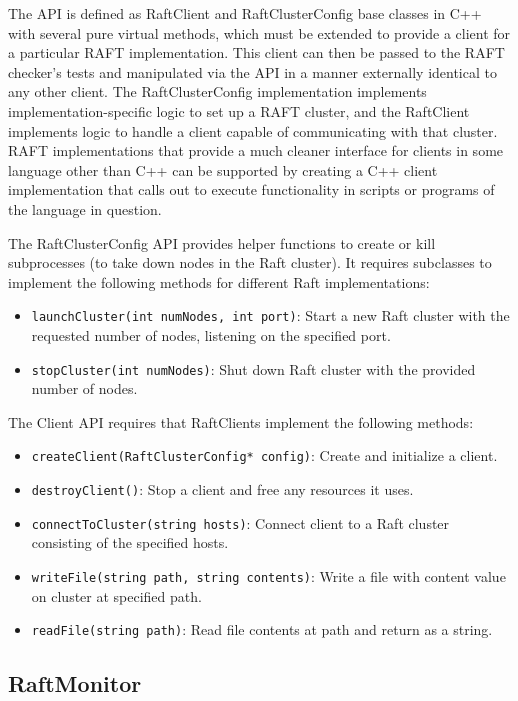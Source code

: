 \documentclass[UTF8]{article}
\begin{document}
The API is defined as RaftClient and RaftClusterConfig base classes in C++ with several pure virtual methods, which must be extended to provide a client for a particular RAFT implementation. This client can then be passed to the RAFT checker's tests and manipulated via the API in a manner externally identical to any other client. The RaftClusterConfig implementation implements implementation-specific logic to set up a RAFT cluster, and the RaftClient implements logic to handle a client capable of communicating with that cluster. RAFT implementations that provide a much cleaner interface for clients in some language other than C++ can be supported by creating a C++ client implementation that calls out to execute functionality in scripts or programs of the language in question.

The RaftClusterConfig API provides helper functions to create or kill subprocesses (to take down nodes in the Raft cluster). It requires subclasses to implement the following methods for different Raft implementations:

\begin{itemize}
\item \texttt{launchCluster(int numNodes, int port)}: Start a new Raft cluster with the requested number of nodes, listening on the specified port.
\item \texttt{stopCluster(int numNodes)}: Shut down Raft cluster with the provided number of nodes.
\end{itemize}

The Client API requires that RaftClients implement the following methods:

\begin{itemize}
\item \texttt{createClient(RaftClusterConfig* config)}: Create and initialize a client.
\item \texttt{destroyClient()}: Stop a client and free any resources it uses.
\item \texttt{connectToCluster(string hosts)}: Connect client to a Raft cluster consisting of the specified hosts.
\item \texttt{writeFile(string path, string contents)}: Write a file with content value on cluster at specified path.
\item \texttt{readFile(string path)}: Read file contents at path and return as a string.
\end{itemize}

\subsection{RaftMonitor}
\end{document}

